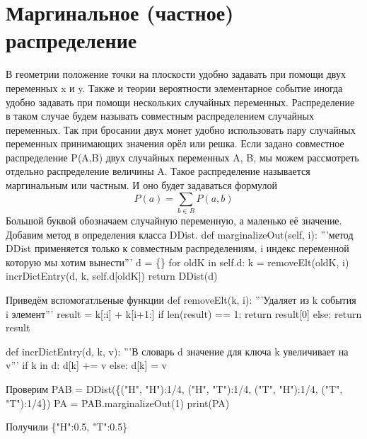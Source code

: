 \section{Маргинальное (частное) распределение}
В геометрии положение точки на плоскости
удобно задавать при помощи двух переменных
x и y. Также и теории вероятности элементарное
событие иногда удобно задавать при помощи
нескольких случайных переменных. 
Распределение в таком случае будем называть совместным
распределением случайных переменных.
Так при
бросании двух монет удобно
использовать пару случайных переменных
принимающих значения орёл или решка.
Если задано совместное распределение P(A,B)
двух случайных переменных A, B, мы можем
рассмотреть отдельно распределение величины A.
Такое распределение называется маргинальным
или частным. И оно будет задаваться формулой
$$ P(a) = \sum_{b \in B} P(a, b) $$
Большой буквой обозначаем случайную переменную,
а маленько её значение.
Добавим метод  в определения класса
DDist.
\nwenddocs{}\endmoddef\nwstartdeflinemarkup\nwenddeflinemarkup
def marginalizeOut(self, i):
        '''метод DDist применяется только
        к совместным распределениям, i индекс
        переменной которую мы хотим вынести'''
        d = \{\}
        for oldK in self.d:
            k = removeElt(oldK, i)
            incrDictEntry(d, k, self.d[oldK])
        return DDist(d)
\nwendcode{}\nwdocspar

Приведём вспомогатльеные функции
\nwenddocs{}\endmoddef\nwstartdeflinemarkup\nwenddeflinemarkup
def removeElt(k, i):
        '''Удаляет из k  события i элемент'''
        result = k[:i] + k[i+1:] 
        if len(result) == 1: 
                return result[0] 
        else: 
                return result

def incrDictEntry(d, k, v):
        '''В словарь d значение для
        ключа k увеличивает на v''' 
        if k in d: 
                d[k] += v 
        else: 
                d[k] = v

\nwendcode{}\nwdocspar

Проверим 
\nwenddocs{}\plusendmoddef\nwstartdeflinemarkup\nwenddeflinemarkup
PAB = DDist(\{("H", "H"):1/4, ("H", "T"):1/4, ("T", "H"):1/4, ("T", "T"):1/4\})
PA = PAB.marginalizeOut(1)
print(PA)
\nwendcode{}\nwdocspar

Получили
\nwenddocs{}\moddef{}\plusendmoddef\nwstartdeflinemarkup\nwenddeflinemarkup
\{"H":0.5, "T":0.5\}
\nwendcode{}\nwdocspar
